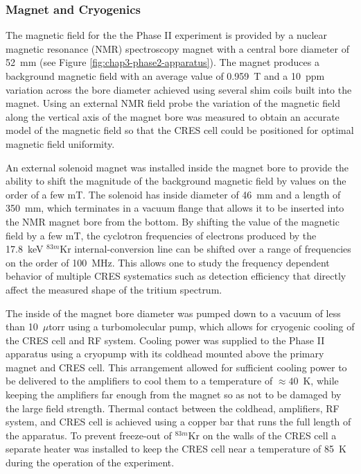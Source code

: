 \subsubsection*{Magnet and Cryogenics}

The magnetic field for the the Phase II experiment is provided by a nuclear magnetic resonance (NMR) spectroscopy magnet with a central bore diameter of 52~mm (see Figure \ref{fig:chap3-phase2-apparatus}). The magnet produces a background magnetic field with an average value of 0.959~T and a 10~ppm variation across the bore diameter achieved using several shim coils built into the magnet. Using an external NMR field probe the variation of the magnetic field along the vertical axis of the magnet bore was measured to obtain an accurate model of the magnetic field so that the CRES cell could be positioned for optimal magnetic field uniformity.

An external solenoid magnet was installed inside the magnet bore to provide the ability to shift the magnitude of the background magnetic field by values on the order of a few mT. The solenoid has inside diameter of 46~mm and a length of 350~mm, which terminates in a vacuum flange that allows it to be inserted into the NMR magnet bore from the bottom. By shifting the value of the magnetic field by a few mT, the cyclotron frequencies of electrons produced by the 17.8~keV $^{83m}$Kr internal-conversion line can be shifted over a range of frequencies on the order of 100~MHz. This allows one to study the frequency dependent behavior of multiple CRES systematics such as detection efficiency that directly affect the measured shape of the tritium spectrum. 

The inside of the magnet bore diameter was pumped down to a vacuum of less than 10~$\mu$torr using a turbomolecular pump, which allows for cryogenic cooling of the CRES cell and RF system. Cooling power was supplied to the Phase II apparatus using a cryopump with its coldhead mounted above the primary magnet and CRES cell. This arrangement allowed for sufficient cooling power to be delivered to the amplifiers to cool them to a temperature of $\approx 40$~K, while keeping the amplifiers far enough from the magnet so as not to be damaged by the large field strength. Thermal contact between the coldhead, amplifiers, RF system, and CRES cell is achieved using a copper bar that runs the full length of the apparatus. To prevent freeze-out of $^{83m}$Kr on the walls of the CRES cell a separate heater was installed to keep the CRES cell near a temperature of 85~K during the operation of the experiment.

